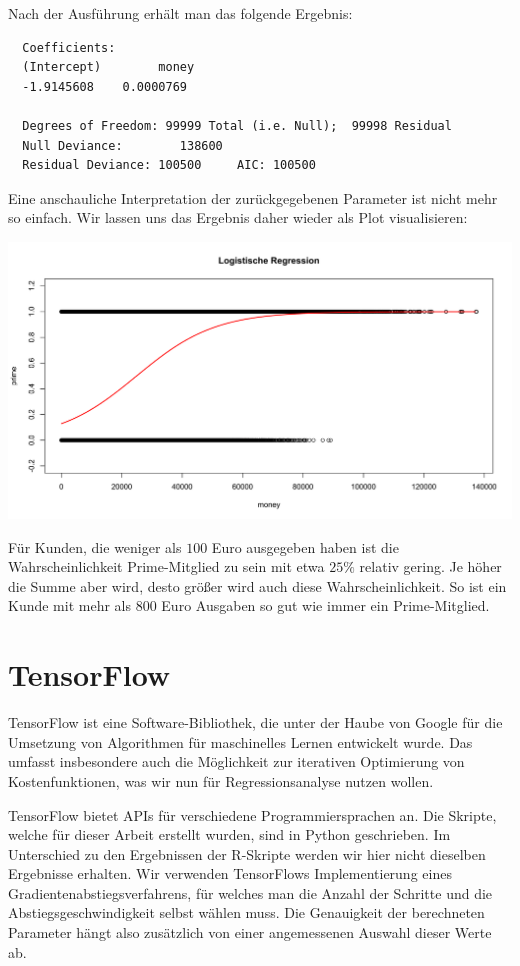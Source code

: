 Nach der Ausführung erhält man das folgende Ergebnis:

\begin{verbatim}
  Coefficients:
  (Intercept)        money
  -1.9145608    0.0000769

  Degrees of Freedom: 99999 Total (i.e. Null);  99998 Residual
  Null Deviance:	    138600
  Residual Deviance: 100500 	AIC: 100500
\end{verbatim}

Eine anschauliche Interpretation der zurückgegebenen Parameter ist nicht mehr so einfach. Wir lassen uns das Ergebnis daher wieder als Plot visualisieren:

\includegraphics[width=\textwidth]{r-logisticRegression}

Für Kunden, die weniger als $100$ Euro ausgegeben haben ist die Wahrscheinlichkeit Prime-Mitglied zu sein mit etwa $25\%$ relativ gering. Je höher die Summe aber wird, desto größer wird auch diese Wahrscheinlichkeit. So ist ein Kunde mit mehr als $800$ Euro Ausgaben so gut wie immer ein Prime-Mitglied.

\section{TensorFlow}

TensorFlow ist eine Software-Bibliothek, die unter der Haube von Google für die Umsetzung von Algorithmen für maschinelles Lernen entwickelt wurde. Das umfasst insbesondere auch die Möglichkeit zur iterativen Optimierung von Kostenfunktionen, was wir nun für Regressionsanalyse nutzen wollen.

TensorFlow bietet APIs für verschiedene Programmiersprachen an. Die Skripte, welche für dieser Arbeit erstellt wurden, sind in Python geschrieben. Im Unterschied zu den Ergebnissen der R-Skripte werden wir hier nicht dieselben Ergebnisse erhalten. Wir verwenden TensorFlows Implementierung eines Gradientenabstiegsverfahrens, für welches man die Anzahl der Schritte und die Abstiegsgeschwindigkeit selbst wählen muss. Die Genauigkeit der berechneten Parameter hängt also zusätzlich von einer angemessenen Auswahl dieser Werte ab.

